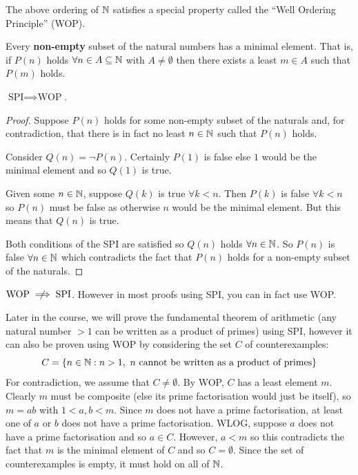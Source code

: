 \documentclass[../main.tex]{subfiles}
\begin{document}
The above ordering of $\mathbb{N}$ satisfies a special property called the ``Well Ordering Principle'' (WOP).
\begin{definition}
  Every \textbf{non-empty} subset of the natural numbers has a minimal element.
  That is, if $P(n)$ holds $\forall n \in  A \subseteq \mathbb{N}$ with $A \neq \emptyset$ then there exists a least $m \in A$ such that $P(m)$ holds. \label{WOP}
\end{definition}
\begin{theorem}
  $\text{SPI} \implies \text{WOP}$.
\end{theorem}
\begin{proof}
  Suppose $P(n)$ holds for some non-empty subset of the naturals and, for contradiction, that there is in fact no least $n \in \mathbb{N}$ such that $P(n)$ holds.

  Consider $Q(n) = \lnot P(n)$.
  Certainly $P(1)$ is false else $1$ would be the minimal element and so $Q(1)$ is true.

  Given some $n \in \mathbb{N}$, suppose $Q(k)$ is true $\forall k < n$.
  Then $P(k)$ is false $\forall k < n$ so $P(n)$ must be false as otherwise $n$ would be the minimal element.
  But this means that $Q(n)$ is true.

  Both conditions of the SPI are satisfied so $Q(n)$ holds $\forall n \in \mathbb{N}$.
  So $P(n)$ is false $\forall n \in \mathbb{N}$ which contradicts the fact that $P(n)$ holds for a non-empty subset of the naturals.
\end{proof}
\begin{remark}
  $\text{WOP} \centernot\implies \text{SPI}$.
  However in most proofs using SPI, you can in fact use WOP.
\end{remark}
\begin{example}
  Later in the course, we will prove the fundamental theorem of arithmetic (any natural number $>1$ can be written as a product of primes) using SPI, however it can also be proven using WOP by considering the set $C$ of counterexamples:
  \[
    C = \{n \in \mathbb{N}: n > 1,\ n \text{ cannot be written as a product of primes}\}
  \]
  For contradiction, we assume that $C \neq \emptyset$.
  By WOP, $C$ has a least element $m$.
  Clearly $m$ must be composite (else its prime factorisation would just be itself), so $m = ab$ with $1 < a, b < m$.
  Since $m$ does not have a prime factorisation, at least one of $a$ or $b$ does not have a prime factorisation.
  WLOG, suppose $a$ does not have a prime factorisation and so $a \in C$.
  However, $a < m$ so this contradicts the fact that $m$ is the minimal element of $C$ and so $C = \emptyset$.
  Since the set of counterexamples is empty, it must hold on all of $\mathbb{N}$.
\end{example}
\end{document}
